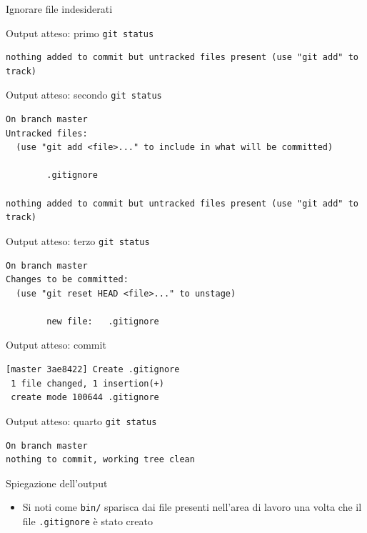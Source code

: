\documentclass[xcolor=dvipsnames,presentation]{beamer}
\begin{document}
\begin{frame}{Ignorare file indesiderati}
\begin{block}{Output atteso: primo \texttt{git status}}
\begin{Verbatim}[fontsize=\scriptsize]
nothing added to commit but untracked files present (use "git add" to track)
        \end{Verbatim}
    \end{block}
    \begin{block}{Output atteso: secondo \texttt{git status}}
        \begin{Verbatim}[fontsize=\scriptsize]
On branch master
Untracked files:
  (use "git add <file>..." to include in what will be committed)

        .gitignore

nothing added to commit but untracked files present (use "git add" to track)
        \end{Verbatim}
    \end{block}
    \begin{block}{Output atteso: terzo \texttt{git status}}
        \begin{Verbatim}[fontsize=\scriptsize]
On branch master
Changes to be committed:
  (use "git reset HEAD <file>..." to unstage)

        new file:   .gitignore

        \end{Verbatim}
    \end{block}
    \begin{block}{Output atteso: commit}
        \begin{Verbatim}[fontsize=\scriptsize]
[master 3ae8422] Create .gitignore
 1 file changed, 1 insertion(+)
 create mode 100644 .gitignore
        \end{Verbatim}
    \end{block}
    \begin{block}{Output atteso: quarto \texttt{git status}}
        \begin{Verbatim}[fontsize=\scriptsize]
On branch master
nothing to commit, working tree clean
        \end{Verbatim}
    \end{block}
    \begin{block}{Spiegazione dell'output}
        \begin{itemize}
            \item Si noti come \texttt{bin/} sparisca dai file presenti nell'area di lavoro una
volta che il file \texttt{.gitignore} è stato creato
        \end{itemize}
    \end{block}
\end{frame}
\end{document}
